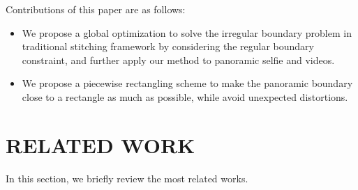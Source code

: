 \documentclass[10pt,journal,compsoc]{IEEEtran}
\begin{document}
Contributions of this paper are as follows:
\begin{itemize}
   \item We propose a global optimization to solve the irregular boundary problem in traditional stitching framework by considering the regular boundary constraint, and further apply our method to panoramic selfie and videos.
   \item We propose a piecewise rectangling scheme to make the panoramic boundary close to a rectangle as much as possible, while avoid unexpected distortions.
\end{itemize}

 \section{RELATED WORK}
In this section, we briefly review the most related works.
\end{document}
